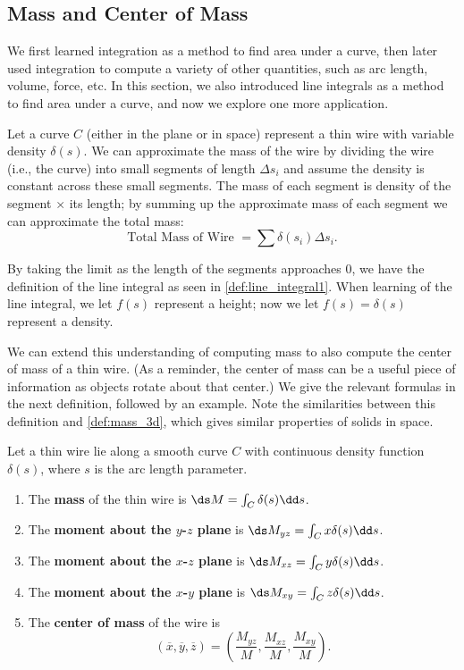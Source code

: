 \subsection{Mass and Center of Mass}

We first learned integration as a method to find area under a curve, then later used integration to compute a variety of other quantities, such as arc length, volume, force, etc. In this section, we also introduced line integrals as a method to find area under a curve, and now we explore one more application.

Let a curve $C$ (either in the plane or in space) represent a thin wire with variable density $\delta(s)$. We can approximate the mass of the wire by dividing the wire (i.e., the curve) into small segments of length $\Delta s_i$ and assume the density is constant across these small segments. The mass of each segment is density of the segment $\times$ its length; by summing up the approximate mass of each segment we can approximate the total mass:
\[\text{Total Mass of Wire } = \sum \delta(s_i)\Delta s_i.\]

By taking the limit as the length of the segments approaches 0, we have the definition of the line integral as seen in \autoref{def:line_integral1}. When learning of the line integral, we let $f(s)$ represent a height; now we let $f(s) = \delta(s)$ represent a density.

We can extend this understanding of computing mass to also compute the center of mass of a thin wire. (As a reminder, the center of mass can be a useful piece of information as objects rotate about that center.) We give the relevant formulas in the next definition, followed by an example. Note the similarities between this definition and \autoref{def:mass_3d}, which gives similar properties of solids in space.

\begin{definition}\label{def:mass_of_thin_wire}
Let a thin wire lie along a smooth curve $C$ with continuous density function $\delta(s)$, where $s$ is the arc length parameter. 	%
\begin{enumerate}
	\item The \textbf{mass} of the thin wire is $\ds M = \int_C \delta(s)\dd s$.
	\item	The \textbf{moment about the $y$-$z$ plane} is $\ds M_{yz} = \int_C x\delta(s)\dd s$.
	
	\item	The \textbf{moment about the $x$-$z$ plane} is $\ds M_{xz} = \int_C y\delta(s)\dd s$.
	\item	The \textbf{moment about the $x$-$y$ plane} is $\ds M_{xy} = \int_C z\delta(s)\dd s$.
	\item The \textbf{center of mass} of the wire is
	\[
	(\overline{x},\overline{y},\overline{z})
	= \left(\frac{M_{yz}}M, \frac{M_{xz}}M,\frac{M_{xy}}M\right).
	\]
\end{enumerate}
\end{definition}


